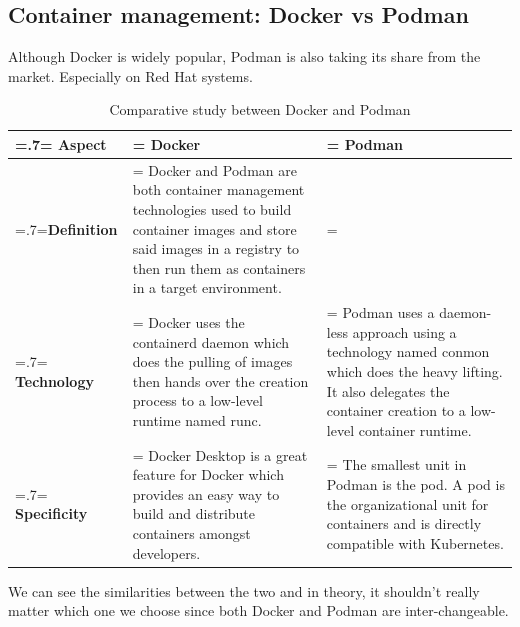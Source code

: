 \subsection{Container management: Docker vs Podman}
Although Docker is widely popular, Podman is also taking its share from the market. Especially on Red Hat systems.
\begin{table}[H]
    \renewcommand{\arraystretch}{1.5}%
    \caption{Comparative study between Docker and Podman}
    \centering
    \medskip
    \begin{tabularx}{1\textwidth} {
            | >{\hsize=.7\hsize\linewidth=\hsize\centering\arraybackslash}X
            | >{\hsize=1.15\hsize\linewidth=\hsize\justifying\arraybackslash}X
            | >{\hsize=1.15\hsize\linewidth=\hsize\justifying\arraybackslash}X |}
        \hline
        \rowcolor{primary} \textbf {Aspect} & \textbf {Docker}                                                                                                                                                                                                                    & \textbf {Podman}                                                                                                                                                                      \\
        \hline
        \textbf {Definition}                & \multicolumn{2}{|>{\hsize=2.35\hsize}X|} {Docker and Podman are both  container management technologies used to build container images and store said images in a registry to then run them as containers in a target environment.}                                                                                                                                                                                         \\
        \hline
        \textbf {Technology}                & \noindent Docker uses the containerd daemon which does the pulling of images then hands over the creation process to a low-level runtime named runc.                                                                                & \noindent Podman uses a daemon-less approach using a technology named conmon which does the heavy lifting. It also delegates the container creation to a low-level container runtime. \\
        \hline
        \textbf {Specificity}               & \noindent Docker Desktop is a great feature for Docker which provides an easy way to build and distribute containers amongst developers.                                                                                            & \noindent The smallest unit in Podman is the pod. A pod is the organizational unit for containers and is directly compatible with Kubernetes.                                         \\
        \hline
    \end{tabularx}
\end{table}
We can see the similarities between the two and in theory, it shouldn't really matter which one we choose since both Docker and Podman are inter-changeable.

